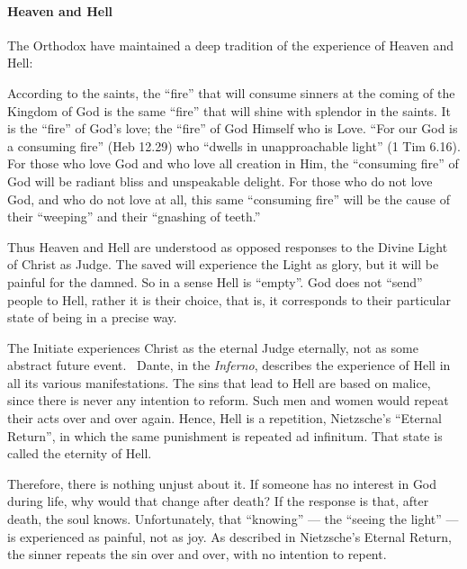 \paragraph{Heaven and Hell}
The Orthodox have maintained a deep tradition of the experience of Heaven and Hell:

\begin{quotex}
According to the saints, the “fire” that will consume sinners at the coming of the Kingdom of God is the same “fire”
that will shine with splendor in the saints. It is the “fire” of God's love; the “fire” of God Himself who
is Love. “For our God is a consuming fire” (Heb 12.29) who “dwells in unapproachable light” (1 Tim 6.16). For those who
love God and who love all creation in Him, the “consuming fire” of God will be radiant bliss and unspeakable delight.
For those who do not love God, and who do not love at all, this same “consuming fire” will be the cause of their
“weeping” and their “gnashing of teeth.”  

\end{quotex}
Thus Heaven and Hell are understood as opposed responses to the Divine Light of Christ as Judge. The saved will
experience the Light as glory, but it will be painful for the damned. So in a sense Hell is “empty”. God does not
“send” people to Hell, rather it is their choice, that is, it corresponds to their particular state of being in a
precise way.

The Initiate experiences Christ as the eternal Judge eternally, not as some abstract future event.  Dante, in the
\emph{Inferno}, describes the experience of Hell in all its various manifestations. The sins that lead to Hell are
based on malice, since there is never any intention to reform. Such men and women would repeat their acts over and over
again. Hence, Hell is a repetition, Nietzsche's “Eternal Return”, in which the same punishment is repeated
ad infinitum. That state is called the eternity of Hell.

Therefore, there is nothing unjust about it. If someone has no interest in God during life, why would that change after
death? If the response is that, after death, the soul knows. Unfortunately, that “knowing” — the “seeing
the light” — is experienced as painful, not as joy. As described in Nietzsche's Eternal Return,
the sinner repeats the sin over and over, with no intention to repent.

